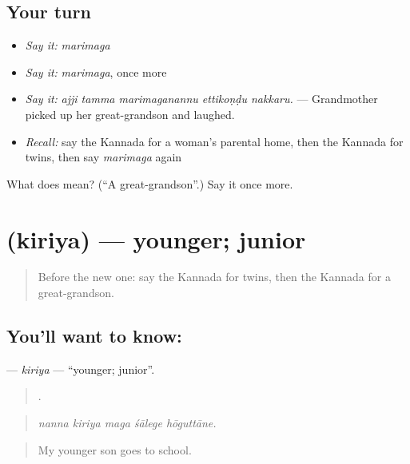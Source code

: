 \subsection*{Your turn}
\begin{itemize}
\raggedright
  \item \emph{Say it:} \emph{marimaga}
  \item \emph{Say it:} \emph{marimaga}, once more
  \item \emph{Say it:} \emph{ajji tamma marimaganannu ettikoṇḍu nakkaru.} — Grandmother picked up her great-grandson and laughed.
  \item \emph{Recall:} say the Kannada for a woman's parental home, then the Kannada for twins, then say \emph{marimaga} again
\end{itemize}

\begin{tcolorbox}[breakable,colback=teal!4,colframe=teal!35!black,title={Before you move on}]
What does  mean? (\textquotedblleft{}A great-grandson\textquotedblright{}.) Say it once more.
\end{tcolorbox}
\section[\texorpdfstring{\kn{ಕಿರಿಯ} (kiriya)}{ಕಿರಿಯ (kiriya)}]{ (kiriya) — younger; junior}

\label{lesson:KA-C526-kiriya}



\begin{quote}
Before the new one: say the Kannada for twins, then the Kannada for a great-grandson.
\end{quote}

\subsection*{You'll want to know: }
\textbf{} — \emph{kiriya} — \textquotedblleft{}younger; junior\textquotedblright{}.

\begin{quote}
    .
\end{quote}

\begin{quote}
\emph{nanna kiriya maga śālege hōguttāne.}
\end{quote}

\begin{quote}
My younger son goes to school.
\end{quote}

